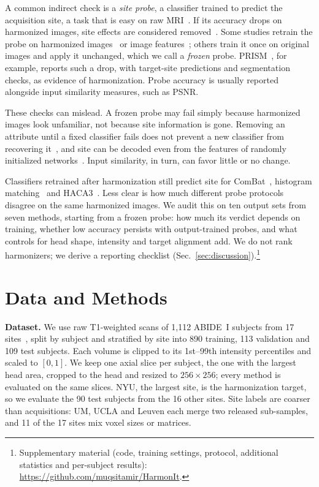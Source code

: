 \documentclass{article}
\begin{document}
A common indirect check is a \emph{site probe}, a classifier trained to predict the acquisition site, a task that is easy on raw MRI~\cite{glocker2019multisite}. If its accuracy drops on harmonized images, site effects are considered removed~\cite{wu2025dlest,wu2026hcld}. Some studies retrain the probe on harmonized images~\cite{wu2025dlest} or image features~\cite{wu2026hcld,dinsdale2021unlearning}; others train it once on original images and apply it unchanged, which we call a \emph{frozen} probe. PRISM~\cite{galada2025prism}, for example, reports such a drop, with target-site predictions and segmentation checks, as evidence of harmonization. Probe accuracy is usually reported alongside input similarity measures, such as PSNR.

These checks can mislead. A frozen probe may fail simply because harmonized images look unfamiliar, not because site information is gone. Removing an attribute until a fixed classifier fails does not prevent a new classifier from recovering it~\cite{elazar2018adversarial}, and site can be decoded even from the features of randomly initialized networks~\cite{rahbar2026fingerprints}. Input similarity, in turn, can favor little or no change.

Classifiers retrained after harmonization still predict site for ComBat~\cite{marzi2024efficacy}, histogram matching~\cite{souza2023shortcuts} and HACA3~\cite{zurita2026psyshared}. Less clear is how much different probe protocols disagree on the same harmonized images. We audit this on ten output sets from seven methods, starting from a frozen probe: how much its verdict depends on training, whether low accuracy persists with output-trained probes, and what controls for head shape, intensity and target alignment add. We do not rank harmonizers; we derive a reporting checklist (Sec.~\ref{sec:discussion}).\footnote{Supplementary material (code, training settings, protocol, additional statistics and per-subject results): \url{https://github.com/muqsitamir/HarmonIt}.}

\section{Data and Methods}
\label{sec:data}
\textbf{Dataset.} We use raw T1-weighted scans of 1,112 ABIDE~I subjects from 17 sites~\cite{dimartino2014abide}, split by subject and stratified by site into 890 training, 113 validation and 109 test subjects. Each volume is clipped to its 1st--99th intensity percentiles and scaled to $[0,1]$. We keep one axial slice per subject, the one with the largest head area, cropped to the head and resized to $256\times256$; every method is evaluated on the same slices. NYU, the largest site, is the harmonization target, so we evaluate the 90 test subjects from the 16 other sites. Site labels are coarser than acquisitions: UM, UCLA and Leuven each merge two released sub-samples, and 11 of the 17 sites mix voxel sizes or matrices.
\end{document}
